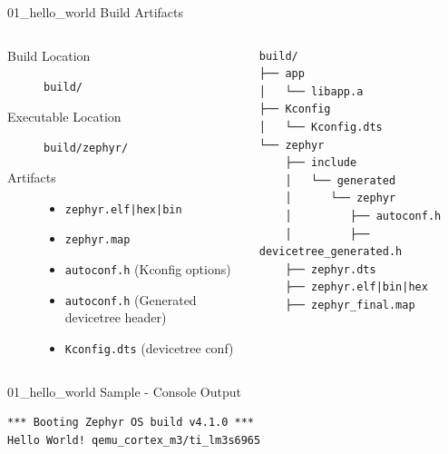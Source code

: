 \documentclass[10pt, aspectratio=169]{beamer}
\begin{document}
\begin{frame}[fragile]{01\_hello\_world Build Artifacts}
  \begin{columns}
    \begin{column}{0.6\textwidth}
      \begin{description}
        \item [Build Location] \texttt{build/}
        \item [Executable Location] \texttt{build/zephyr/}
        \item [Artifacts]
          \begin{itemize}
            \item \texttt{zephyr.elf|hex|bin}
            \item \texttt{zephyr.map}
            \item \texttt{autoconf.h} (Kconfig options)
            \item \texttt{autoconf.h} (Generated devicetree header)
            \item \texttt{Kconfig.dts} (devicetree conf)
          \end{itemize}
      \end{description}
    \end{column}
    \begin{column}{0.4\textwidth}
        {\fontsize{7}{7}\selectfont
          \begin{verbatim}
build/
├── app
│   └── libapp.a
├── Kconfig
│   └── Kconfig.dts
└── zephyr
    ├── include
    │   └── generated
    │      └── zephyr
    │         ├── autoconf.h
    │         ├── devicetree_generated.h
    ├── zephyr.dts
    ├── zephyr.elf|bin|hex
    ├── zephyr_final.map
          \end{verbatim}
        }
    \end{column}
  \end{columns}
\end{frame}
\begin{frame}[fragile]{01\_hello\_world Sample - Console Output}
  \begin{listing}[H]
    \begin{verbatim}
*** Booting Zephyr OS build v4.1.0 ***
Hello World! qemu_cortex_m3/ti_lm3s6965
    \end{verbatim}
  \caption{\scriptsize{Console Output}}
  \end{listing}
\end{frame}
\end{document}
